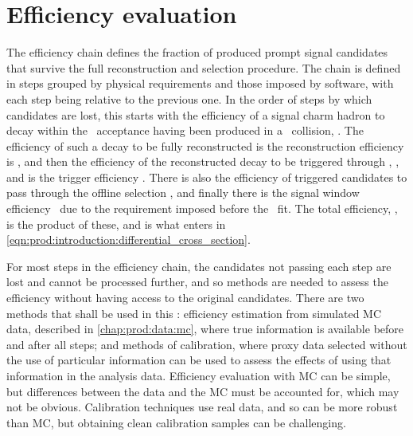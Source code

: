 \chapter{Efficiency evaluation}
\label{chap:prod:effs}


The efficiency chain defines the fraction of produced prompt signal candidates 
that survive the full reconstruction and selection procedure.
The chain is defined in steps grouped by physical requirements and those 
imposed by software, with each step being relative to the previous one.
In the order of steps by which candidates are lost, this starts with the 
efficiency of a signal charm hadron to decay within the \lhcb\ acceptance 
having been produced in a \pp\ collision, \effacc.
The efficiency of such a decay to be fully reconstructed is the reconstruction 
efficiency is \effreco, and then the efficiency of the reconstructed decay to 
be triggered through \lzero, \hltone, and \hlttwo is the trigger efficiency 
\efftrig.
There is also the efficiency of triggered candidates to pass through the 
offline selection \effoffline, and finally there is the signal window 
efficiency \effsigwin\ due to the requirement imposed before the \lnipchisq\ 
fit.
The total efficiency, \eff, is the product of these, and is what enters in 
\cref{eqn:prod:introduction:differential_cross_section}.

For most steps in the efficiency chain, the candidates not passing each step 
are lost and cannot be processed further, and so methods are needed to assess the 
efficiency without having access to the original candidates.
There are two methods that shall be used in this : 
efficiency estimation from simulated \acf{MC} data, described in 
\cref{chap:prod:data:mc}, where true information is available before and after 
all steps; and methods of calibration, where proxy data selected without the 
use of particular information can be used to assess the effects of using that information in the 
analysis data.
Efficiency evaluation with \ac{MC} can be simple, but differences between the 
data and the \ac{MC} must be accounted for, which may not be obvious.
Calibration techniques use real data, and so can be more robust than \ac{MC}, 
but obtaining clean calibration samples can be challenging.

